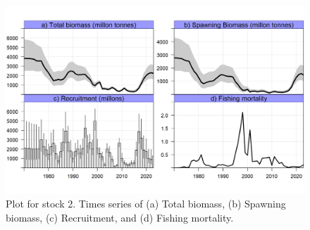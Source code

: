 \documentclass{article}
\begin{document}
\begin{figure}[H]
    \centering
    \includegraphics[scale = .9]{stock2.png}
    \caption{Plot for stock 2.  Times series of (a) Total biomass, (b) Spawning biomass, (c) Recruitment, and (d) Fishing mortality.}
    \label{fig:mesh3}
\end{figure}




\label{section:AppendixB}
\nocite{*}



% 
\printbibliography

\end{document}
